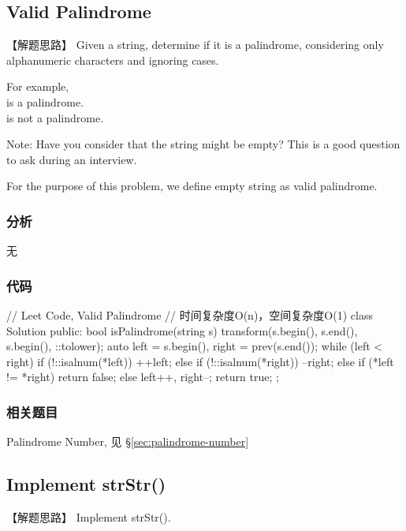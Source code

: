 \subsection{Valid Palindrome} %
\label{sec:valid-palindrome}


【解题思路】
Given a string, determine if it is a palindrome, considering only alphanumeric characters and ignoring cases.

For example,\\
 is a palindrome.\\
 is not a palindrome.

Note:
Have you consider that the string might be empty? This is a good question to ask during an interview.

For the purpose of this problem, we define empty string as valid palindrome.


\subsubsection{分析}
无


\subsubsection{代码}
\begin{Code}
	// Leet Code, Valid Palindrome
	// 时间复杂度O(n)，空间复杂度O(1)
	class Solution {
		public:
		bool isPalindrome(string s) {
			transform(s.begin(), s.end(), s.begin(), ::tolower);
			auto left = s.begin(), right = prev(s.end());
			while (left < right) {
				if (!::isalnum(*left))  ++left;
				else if (!::isalnum(*right)) --right;
				else if (*left != *right) return false;
				else{ left++, right--; }
			}
			return true;
		}
	};
\end{Code}


\subsubsection{相关题目}
\begindot
\item Palindrome Number, 见 \S \ref{sec:palindrome-number}
\myenddot


\subsection{Implement strStr()} %
\label{sec:strstr}


【解题思路】
Implement strStr().

